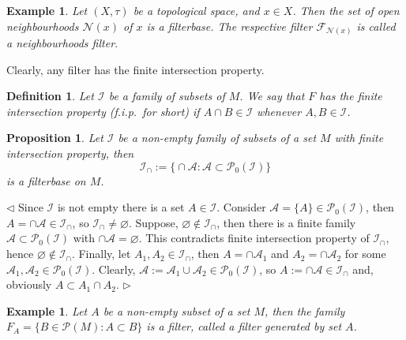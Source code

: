 \documentclass[12pt]{article}
\newtheorem{proposition}[theorem]{Proposition}
\newtheorem{definition}[theorem]{Definition}
\newtheorem{example}[theorem]{Example}
\newenvironment{proof}{\par $\triangleleft$}{$\triangleright$}
\begin{document}
\begin{example}\label{ExNeighbourhoodsFilter} Let $(X,\tau )$ be a topological
    space, and $x\in X$. Then the set of open neighbourhoods $\mathcal{N}(x)$ of
    $x$ is a filterbase. The respective filter $\mathcal{F}_{\mathcal{N}(x)}$ is
    called a neighbourhoods filter.
\end{example}

Clearly, any filter has the finite intersection property.

\begin{definition} Let $\mathcal{I}$ be a family of subsets of $M$. We say that
    $F$ has the finite intersection property (f.i.p.\ for short) if $A\cap B\in
        \mathcal{I}$ whenever $A,B\in \mathcal{I}$.
\end{definition}

\begin{proposition} Let $\mathcal{I}$ be a non-empty family of subsets of a set
    $M$ with finite intersection property, then
    $$
        \mathcal{I}_{\cap}:=\big \{\cap \mathcal{A} :
        \mathcal{A}\subset\mathcal{P}_0(\mathcal{I})\big \}
    $$
    is a filterbase on $M$.
\end{proposition}
\begin{proof} Since $\mathcal{I}$ is not empty there is a set $A\in\mathcal{I}$.
    Consider $\mathcal{A}=\{A \}\in\mathcal{P}_0(\mathcal{I})$, then
    $A=\cap\mathcal{A}\in\mathcal{I}_{\cap}$, so
    $\mathcal{I}_{\cap}\neq\varnothing$. Suppose, $\varnothing \notin
        \mathcal{I}_{\cap}$, then there is a finite family
    $\mathcal{A}\subset\mathcal{P}_0(\mathcal{I})$ with
    $\cap\mathcal{A}=\varnothing$. This contradicts finite intersection property
    of $\mathcal{I}_{\cap}$, hence $\varnothing \notin \mathcal{I}_{\cap}$.
    Finally, let $A_1, A_2\in\mathcal{I}_{\cap}$, then $A=\cap\mathcal{A}_1$ and
    $A_2=\cap\mathcal{A}_2$ for some
    $\mathcal{A}_1,\mathcal{A}_2\in\mathcal{P}_0(\mathcal{I})$. Clearly,
    $\mathcal{A}:=\mathcal{A}_1\cup\mathcal{A}_2\in\mathcal{P}_0(\mathcal{I})$,
    so $A:=\cap\mathcal{A}\in\mathcal{I}_{\cap}$ and, obviously $A\subset
        A_1\cap A_2$.
\end{proof}

\begin{example}\label{ExFilterGenBySet} Let $A$ be a non-empty subset of a set
    $M$, then the family $F_A=\{B\in\mathcal{P}(M):A\subset B\}$ is a filter,
    called a filter generated by set $A$.
\end{example}
\end{document}
